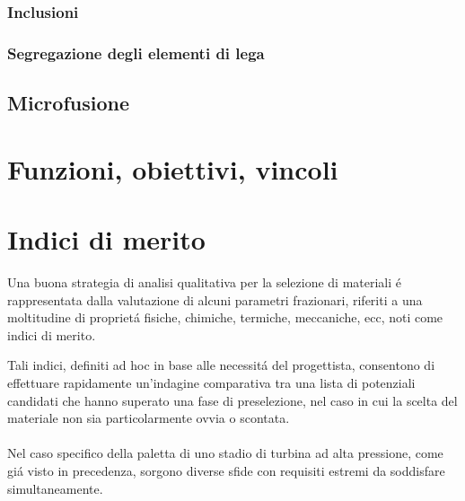 \documentclass{article}
\begin{document}
            \clearpage 

            \subsubsection{Inclusioni\label{Casting_difetti_inclusioni}}

            \clearpage 

            \subsubsection{Segregazione degli elementi di lega\label{Casting_difetti_segregazione}}
    
            \clearpage

        \subsection{Microfusione\label{Casting_microfusione}}



        \clearpage

    \section{Funzioni, obiettivi, vincoli\label{Funzioni_ob_vinc}}


    \clearpage 


    \section{Indici di merito\label{material_index}}

        Una buona strategia di analisi qualitativa per la selezione di materiali é rappresentata dalla valutazione di alcuni parametri frazionari, riferiti a una moltitudine di proprietá fisiche, chimiche, termiche, meccaniche, ecc, noti come indici di merito.
        
        Tali indici, definiti ad hoc in base alle necessitá del progettista, consentono di effettuare rapidamente un’indagine comparativa tra una lista di potenziali candidati che hanno superato una fase di preselezione, nel caso in cui la scelta del materiale non sia particolarmente ovvia o scontata. 
        \\ \\
        Nel caso specifico della paletta di uno stadio di turbina ad alta pressione, come giá visto in precedenza, sorgono diverse sfide con requisiti estremi da soddisfare simultaneamente.
\end{document}
